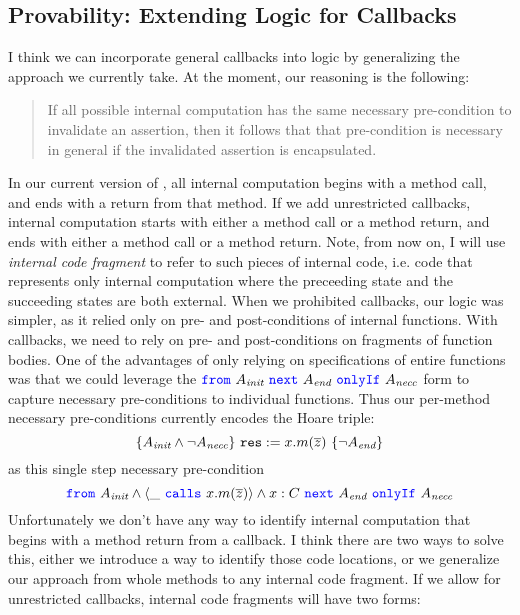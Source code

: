 \documentclass[11pt]{article} %
\begin{document}
\subsection{Provability: Extending \Nec Logic for Callbacks}
I think we can incorporate general callbacks into \Nec logic
by generalizing the approach we currently take. At the moment,
our reasoning is the following:
\begin{quotation}
If all possible internal computation has the same 
necessary pre-condition to invalidate an assertion,
then it follows that that pre-condition is necessary
in general if the invalidated assertion is encapsulated.
\end{quotation}
In our current version of \Nec, all internal computation 
begins with a method call, and ends with a return from that
method. If we add unrestricted callbacks, internal computation
starts with either a method call or a method return, and ends with
either a method call or a method return. Note, from now on, 
I will use \emph{internal code fragment} to refer to such pieces
of internal code, i.e. code that represents only internal computation
where the preceeding state and the succeeding states are both external. 
When we prohibited
callbacks, our logic was simpler, as it relied only on pre- and
post-conditions of internal functions. With callbacks, we need
to rely on pre- and post-conditions on fragments of function bodies.
One of the advantages of only relying on specifications of entire
functions was that we could leverage the ${\color{blue}\texttt{from}}\ A_{\textit{init}}\ {\color{blue}\texttt{next}}\ A_{\textit{end}}\ {\color{blue}\texttt{onlyIf}}\ A_{\textit{necc}}$ form to capture necessary 
pre-conditions to individual functions. Thus our per-method 
necessary pre-conditions currently encodes the Hoare triple:
\[
\{A_{\textit{init}} \wedge \neg A_{\textit{necc}}\}\ {\texttt{res}} := x.m(\overline{z})\ \{\neg A_{\textit{end}}\}
\]
as this single step necessary pre-condition
\[
{\color{blue}\texttt{from}}\ A_{\textit{init}} \wedge \langle \_\ {\color{blue}\texttt{calls}}\ x.m(\overline{z}) \rangle \wedge x : C\ {\color{blue}\texttt{next}}\ A_{\textit{end}}\ {\color{blue}\texttt{onlyIf}}\ A_{\textit{necc}}
\]
Unfortunately we don't have any way to identify internal computation 
that begins with a method return from a callback. I think there are 
two ways to solve this, either we introduce a way to identify those
code locations, or we generalize our approach from whole methods to 
any internal code fragment. If we allow for unrestricted callbacks,
internal code fragments will have two forms:
\end{document}
